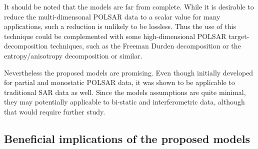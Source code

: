 It should be noted that the models are far from complete.
While it is desirable to reduce the multi-dimensonal POLSAR data to a scalar value for many applications,
  such a reduction is unlikely to be lossless.  
Thus %
the use of this technique could be complemented with some high-dimensional POLSAR target-decomposition techniques, such as the Freeman Durden decomposition \cite{Freeman_1998_TGRS_963} or the entropy/anisotropy decomposition \cite{Cloude_1997_TGRS_68} or similar.

Nevertheless the proposed models are promising.
Even though initially developed for partial and monostatic POLSAR data,
  it was shown to be applicable to traditional SAR data as well.
Since the models assumptions are quite minimal, they may potentially applicable to bi-static and interferometric data, although that would require further study.

%
%

 \subsection{Beneficial implications of the proposed models}

